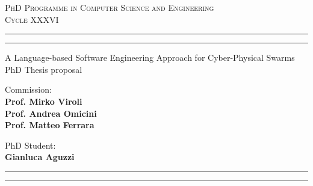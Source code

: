 \documentclass[11pt]{article}
\begin{document}
\sloppy
\begin{center}
	{{
		\Large{
			\textsc{PhD Programme in Computer Science and Engineering \\ 
			\vspace{4mm}
			Cycle XXXVI}
			}
	}} 
	\rule[0.1cm]{\textwidth}{0.1mm}
	\rule[0.4cm]{\textwidth}{0.6mm}
\end{center}

\begin{center}
	{\LARGE{A Language-based Software Engineering Approach for Cyber-Physical Swarms}} \\
	\vspace{4mm}
	{\large{PhD Thesis proposal}} 
	\vspace{4mm}
\end{center}
\vspace{8mm}
\par
\noindent
\begin{minipage}[t]{0.47\textwidth}

{\large{Commission: \\\bf
Prof. Mirko Viroli \\
Prof. Andrea Omicini \\
Prof. Matteo Ferrara} 
}
\end{minipage}
\hfill
\begin{minipage}[t]{0.47\textwidth}
	\raggedleft
	{
		\large{PhD Student: \\\bf Gianluca Aguzzi}
	}
\end{minipage}
\vspace{10mm}

{
	\raggedright
	\rule[0.1cm]{\textwidth}{0.6mm}
	\rule[0.5cm]{\textwidth}{0.1mm}
}
\end{document}
